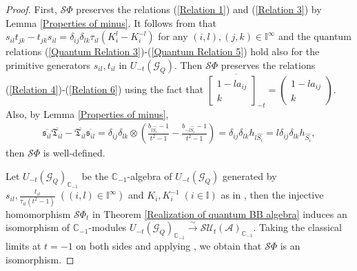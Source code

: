 \documentclass[12pt]{amsart}
\theoremstyle{definition}
\numberwithin{equation}{section}
\begin{document}
\begin{proof}
    First, $ \mathcal{S}\Phi $ preserves the relations (\ref{Relation 1}) and (\ref{Relation 3}) by Lemma \ref{Properties of minus}. 
    It follows from \cite[Proposition 2.8]{FKKB21} that $  s_{il}t_{jk} - t_{jk}s_{il} = \delta_{ij}\delta_{lk} \tau_{il}(K_i^l-K_i^{-l})  $ for any $ (i,l),(j,k) \in \mathbb{I}^{\infty} $ and the quantum relations (\ref{Quantum Relation 3})-(\ref{Quantum Relation 5}) hold also for the primitive generators $ s_{il},t_{il} $ in $  U_{-t}(\mathcal{G}_Q) $. 
    Then $ \mathcal{S}\Phi $ preserves the relations (\ref{Relation 4})-(\ref{Relation 6}) using the fact that $ \overline{\begin{bmatrix}
            1-la_{ij}  \\ k
        \end{bmatrix}_{-t}} = \begin{pmatrix}
            1-la_{ij}  \\ k
        \end{pmatrix} $. 
    Also, by Lemma \ref{Properties of minus},
    \begin{align*}
        \overline{\mathfrak{s}_{il}}\overline{\mathfrak{T}_{il}} - \overline{\mathfrak{T}_{il}}\overline{\mathfrak{s}_{il}}= \delta_{ij}\delta_{lk} \otimes (\frac{b_{l\widehat{S_i}}-1}{t^2-1}-\frac{b_{-l\widehat{S_i}}-1}{t^2-1}) =  \delta_{ij}\delta_{lk} h_{l\widehat{S_i}} = l\delta_{ij}\delta_{lk} h_{\widehat{S_i}},
    \end{align*}
    then $ \mathcal{S}\Phi $ is well-defined. 
    
    Let $ U_{-t}(\mathcal{G}_Q)_{\mathbb{C}_{-1}} $ be the $ \mathbb{C}_{-1} $-algebra of $ U_{-t}(\mathcal{G}_Q) $ generated by $ s_{il}, \frac{t_{il}}{\tau_{il}(t^2-1)} \;((i,l) \in \mathbb{I}^{\infty}) $ and $ K_i, K_i^{-1}\;(i\in \mathbb{I}) $ as in \cite[Definition 3.1]{FKKB21}, then the injective homomorphism $ \mathcal{S}\Phi_t $ in Theorem \ref{Realization of quantum BB algebra} induces an isomorphism of $ \mathbb{C}_{-1} $-modules $ U_{-t}(\mathcal{G}_Q)_{\mathbb{C}_{-1}} \xrightarrow{\sim} \mathcal{SU}_t(\mathcal{A})_{\mathbb{C}_{-1}} $. 
    Taking the classical limits at $ t=-1 $ on both sides and applying \cite[Theorem 4.3]{FKKB21}, we obtain that $ \mathcal{S}\Phi $ is an isomorphism.

\end{proof}

\subsubsection{}
\end{document}
